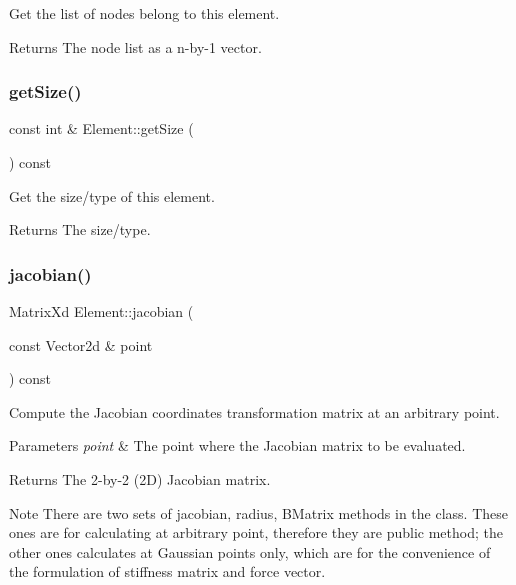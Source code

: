Get the list of nodes belong to this element. 

\begin{DoxyReturn}{Returns}
The node list as a n-\/by-\/1 vector. 
\end{DoxyReturn}
\mbox{\label{class_element_a0221b246d9ca632136cc39790c46ee8f}} 
\subsubsection{\texorpdfstring{get\+Size()}{getSize()}}
{\footnotesize\ttfamily const int \& Element\+::get\+Size (\begin{DoxyParamCaption}{ }\end{DoxyParamCaption}) const}



Get the size/type of this element. 

\begin{DoxyReturn}{Returns}
The size/type. 
\end{DoxyReturn}
\mbox{\label{class_element_ae0c7de742f6835b6ede7d28fa73c7594}} 
\subsubsection{\texorpdfstring{jacobian()}{jacobian()}}
{\footnotesize\ttfamily Matrix\+Xd Element\+::jacobian (\begin{DoxyParamCaption}\item[{const Vector2d \&}]{point }\end{DoxyParamCaption}) const}



Compute the Jacobian coordinates transformation matrix at an arbitrary point. 


\begin{DoxyParams}{Parameters}
{\em point} & The point where the Jacobian matrix to be evaluated. \\
\hline
\end{DoxyParams}
\begin{DoxyReturn}{Returns}
The 2-\/by-\/2 (2D) Jacobian matrix.
\end{DoxyReturn}
\begin{DoxyNote}{Note}
There are two sets of jacobian, radius, B\+Matrix methods in the class. These ones are for calculating at arbitrary point, therefore they are public method; the other ones calculates at Gaussian points only, which are for the convenience of the formulation of stiffness matrix and force vector. 
\end{DoxyNote}
\mbox{\label{class_element_a24c9d2dd309a28a8891d6b710a8aa0c9}} 
